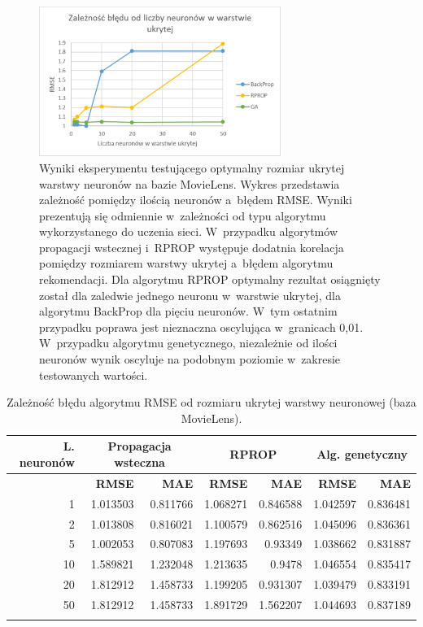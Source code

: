 \documentclass[twoside]{iisthesis}
\begin{document}
			\begin{figure}[!ht]
				\centering
				\includegraphics[width=0.7\textwidth]{exphiddenneural}
				\caption{Wyniki eksperymentu testującego optymalny rozmiar ukrytej warstwy neuronów na bazie MovieLens. Wykres przedstawia zależność pomiędzy ilością neuronów a~błędem RMSE. Wyniki prezentują się odmiennie w~zależności od typu algorytmu wykorzystanego do uczenia sieci. W~przypadku algorytmów propagacji wstecznej i~RPROP występuje dodatnia korelacja pomiędzy rozmiarem warstwy ukrytej a~błędem algorytmu rekomendacji. Dla algorytmu RPROP optymalny rezultat osiągnięty został dla zaledwie jednego neuronu w~warstwie ukrytej, dla algorytmu BackProp dla pięciu neuronów. W~tym ostatnim przypadku poprawa jest nieznaczna oscylująca w~granicach 0,01. W~przypadku algorytmu genetycznego, niezależnie od ilości neuronów wynik oscyluje na podobnym poziomie w~zakresie testowanych wartości.}
				\label{fig:exphiddenneural}
			\end{figure}
			
			\begin{longtable}{r||rr|rr|rr}
				\label{tab:exphiddenneural}
				\centering
				\textbf{L. neuronów} &  \multicolumn{2}{c|}{\textbf{Propagacja wsteczna}}  & \multicolumn{2}{c|}{\textbf{RPROP}} & \multicolumn{2}{c}{\textbf{Alg. genetyczny}}  \\
				\hline
				& \textbf{RMSE} & \textbf{MAE} & \textbf{RMSE} & \textbf{MAE} & \textbf{RMSE} & \textbf{MAE} \\
				\hline
				1                                   & 1.013503                          & 0.811766 & 1.068271 & 0.846588 & 1.042597 & 0.836481 \\
				2                                   & 1.013808                          & 0.816021 & 1.100579 & 0.862516 & 1.045096 & 0.836361 \\
				5                                   & 1.002053                          & 0.807083 & 1.197693 & 0.93349  & 1.038662 & 0.831887 \\
				10                                  & 1.589821                          & 1.232048 & 1.213635 & 0.9478   & 1.046554 & 0.835417 \\
				20                                  & 1.812912                          & 1.458733 & 1.199205 & 0.931307 & 1.039479 & 0.833191 \\
				50                                  & 1.812912                          & 1.458733 & 1.891729 & 1.562207 & 1.044693 & 0.837189\\		
				\caption{Zależność błędu algorytmu RMSE od rozmiaru ukrytej warstwy neuronowej (baza MovieLens).}
			\end{longtable}
		
\end{document}
